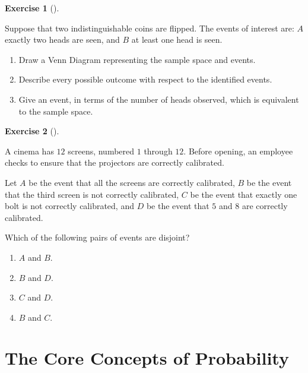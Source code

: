 \documentclass[
  letterpaper,
  DIV=11,
  numbers=noendperiod]{scrreprt}
\providecommand{\tightlist}{%
  \setlength{\itemsep}{0pt}\setlength{\parskip}{0pt}}\usepackage{longtable,booktabs,array}
\theoremstyle{definition}
\theoremstyle{definition}
\newtheorem{exercise}{Exercise}[chapter]
\theoremstyle{definition}
\theoremstyle{remark}
\begin{document}
\begin{exercise}[]\protect\hypertarget{exr-2.6}{}\label{exr-2.6}

Suppose that two indistinguishable coins are flipped. The events of
interest are: \(A\) exactly two heads are seen, and \(B\) at least one
head is seen.

\begin{enumerate}
\def\labelenumi{\alph{enumi}.}
\tightlist
\item
  Draw a Venn Diagram representing the sample space and events.
\item
  Describe every possible outcome with respect to the identified events.
\item
  Give an event, in terms of the number of heads observed, which is
  equivalent to the sample space.
\end{enumerate}

\end{exercise}

\begin{exercise}[]\protect\hypertarget{exr-2.7}{}\label{exr-2.7}

A cinema has \(12\) screens, numbered \(1\) through \(12\). Before
opening, an employee checks to ensure that the projectors are correctly
calibrated.

Let \(A\) be the event that all the screens are correctly calibrated,
\(B\) be the event that the third screen is not correctly calibrated,
\(C\) be the event that exactly one bolt is not correctly calibrated,
and \(D\) be the event that \(5\) and \(8\) are correctly calibrated.

Which of the following pairs of events are disjoint?

\begin{enumerate}
\def\labelenumi{\alph{enumi}.}
\tightlist
\item
  \(A\) and \(B\).
\item
  \(B\) and \(D\).
\item
  \(C\) and \(D\).
\item
  \(B\) and \(C\).
\end{enumerate}

\end{exercise}

\chapter{The Core Concepts of
Probability}\label{the-core-concepts-of-probability}
\end{document}
